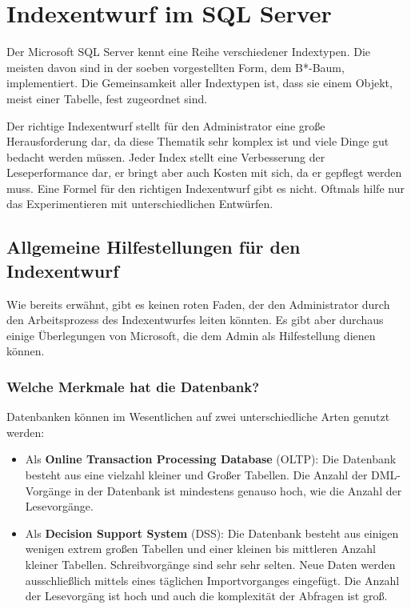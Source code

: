     \section{Indexentwurf im SQL Server}
      Der Microsoft SQL Server kennt eine Reihe verschiedener Indextypen. Die
      meisten davon sind in der soeben vorgestellten Form, dem B*-Baum,
      implementiert. Die Gemeinsamkeit aller Indextypen ist, dass sie einem
      Objekt, meist einer Tabelle, fest zugeordnet sind.
      
      Der richtige Indexentwurf stellt für den Administrator eine große
      Herausforderung dar, da diese Thematik sehr komplex ist und viele Dinge
      gut bedacht werden müssen. Jeder Index stellt eine Verbesserung der
      Leseperformance dar, er bringt aber auch Kosten mit sich, da er gepflegt
      werden muss. Eine Formel für den richtigen Indexentwurf gibt es nicht.
      Oftmals hilfe nur das Experimentieren mit unterschiedlichen Entwürfen.     
      \subsection{Allgemeine Hilfestellungen für den Indexentwurf}
        Wie bereits erwähnt, gibt es keinen roten Faden, der den Administrator
        durch den Arbeitsprozess des Indexentwurfes leiten könnten. Es gibt aber
        durchaus einige Überlegungen von Microsoft, die dem Admin als
        Hilfestellung dienen können.
        \subsubsection{Welche Merkmale hat die Datenbank?}
          Datenbanken können im Wesentlichen auf zwei unterschiedliche Arten
          genutzt werden:
          \begin{itemize}
            \item Als \textbf{Online Transaction Processing Database} (OLTP):
            Die Datenbank besteht aus eine vielzahl kleiner und Großer
            Tabellen. Die Anzahl der DML-Vorgänge in der Datenbank ist
            mindestens genauso hoch, wie die Anzahl der Lesevorgänge.
            \item Als \textbf{Decision Support System} (DSS): Die Datenbank
            besteht aus einigen wenigen extrem großen Tabellen und einer kleinen bis
            mittleren Anzahl kleiner Tabellen. Schreibvorgänge sind sehr sehr
            selten. Neue Daten werden ausschließlich mittels eines
            täglichen Importvorganges eingefügt. Die Anzahl der Lesevorgäng
            ist hoch und auch die komplexität der Abfragen ist groß.
          \end{itemize}
